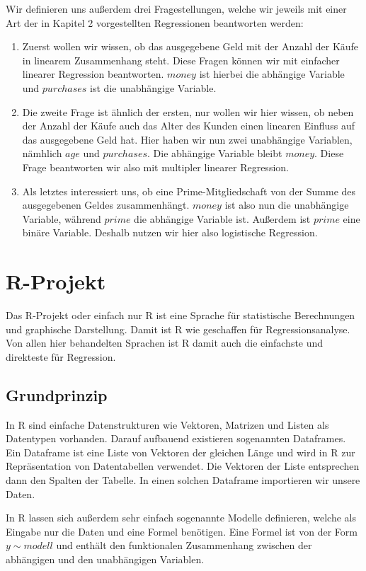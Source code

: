 Wir definieren uns außerdem drei Fragestellungen, welche wir jeweils mit einer Art der in Kapitel 2 vorgestellten Regressionen beantworten werden:
\begin{enumerate}
  \item Zuerst wollen wir wissen, ob das ausgegebene Geld mit der Anzahl der Käufe in linearem Zusammenhang steht. Diese Fragen können wir mit einfacher linearer Regression beantworten. $money$ ist hierbei die abhängige Variable und $purchases$ ist die unabhängige Variable.
  \item Die zweite Frage ist ähnlich der ersten, nur wollen wir hier wissen, ob neben der Anzahl der Käufe auch das Alter des Kunden einen linearen Einfluss auf das ausgegebene Geld hat. Hier haben wir nun zwei unabhängige Variablen, nämhlich $age$ und $purchases$. Die abhängige Variable bleibt $money$. Diese Frage beantworten wir also mit multipler linearer Regression.
  \item Als letztes interessiert uns, ob eine Prime-Mitgliedschaft von der Summe des ausgegebenen Geldes zusammenhängt. $money$ ist also nun die unabhängige Variable, während $prime$ die abhängige Variable ist. Außerdem ist $prime$ eine binäre Variable. Deshalb nutzen wir hier also logistische Regression.
\end{enumerate}

\section{R-Projekt}
Das R-Projekt oder einfach nur R ist eine Sprache für statistische Berechnungen und graphische Darstellung. Damit ist R wie geschaffen für Regressionsanalyse. Von allen hier behandelten Sprachen ist R damit auch die einfachste und direkteste für Regression.

\subsection{Grundprinzip}

In R sind einfache Datenstrukturen wie Vektoren, Matrizen und Listen als Datentypen vorhanden. Darauf aufbauend existieren sogenannten Dataframes. Ein Dataframe ist eine Liste von Vektoren der gleichen Länge und wird in R zur Repräsentation von Datentabellen verwendet. Die Vektoren der Liste entsprechen dann den Spalten der Tabelle. In einen solchen Dataframe importieren wir unsere Daten.

In R lassen sich außerdem sehr einfach sogenannte Modelle definieren, welche als Eingabe nur die Daten und eine Formel benötigen. Eine Formel ist von der Form $y \sim modell$ und enthält den funktionalen Zusammenhang zwischen der abhängigen und den unabhängigen Variablen.

